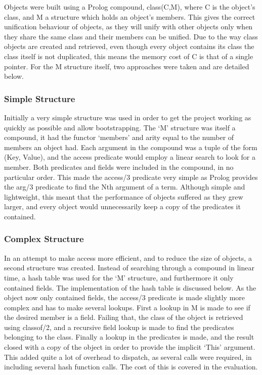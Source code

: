 \documentclass[12pt,a4paper,twoside,openright]{report}
\begin{document}
Objects were built using a Prolog compound, class(C,M), where C is the object's class, and M a structure which holds an object's members. This gives the correct unification behaviour of objects, as they will unify with other objects only when they share the same class and their members can be unified. Due to the way class objects are created and retrieved, even though every object contains its class the class itself is not duplicated, this means the memory cost of C is that of a single pointer. For the M structure itself, two approaches were taken and are detailed below.
	
		\subsubsection{Simple Structure}
		
Initially a very simple structure was used in order to get the project working as quickly as possible and allow bootstrapping. The `M' structure was itself a compound, it had the functor `members' and arity equal to the number of members an object had. Each argument in the compound was a tuple of the form (Key, Value), and the access predicate would employ a linear search to look for a member. Both predicates and fields were included in the compound, in no particular order. This made the access/3 predicate very simple as Prolog provides the arg/3 predicate to find the Nth argument of a term. Although simple and lightweight, this meant that the performance of objects suffered as they grew larger, and every object would unnecessarily keep a copy of the predicates it contained.

		\subsubsection{Complex Structure}
		
In an attempt to make access more efficient, and to reduce the size of objects, a second structure was created. Instead of searching through a compound in linear time, a hash table was used for the `M' structure, and furthermore it only contained fields. The implementation of the hash table is discussed below. As the object now only contained fields, the access/3 predicate is made slightly more complex and has to make several lookups. First a lookup in M is made to see if the desired member is a field. Failing that, the class of the object is retrieved using classof/2, and a recursive field lookup is made to find the predicates belonging to the class. Finally a lookup in the predicates is made, and the result closed with a copy of the object in order to provide the implicit `This' argument. This added quite a lot of overhead to dispatch, as several calls were required, in including several hash function calls. The cost of this is covered in the evaluation.
		
\end{document}
